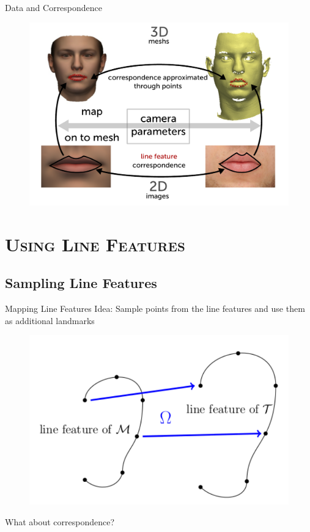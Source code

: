 \documentclass[xcolor=x11names,compress]{beamer}
\begin{document}
    \begin{frame}{Data and Correspondence}
        \begin{figure}
            \includegraphics[width=.9\textwidth]{../resources/figures/givendata3.pdf}
        \end{figure}
    \end{frame}

    \section{\scshape Using Line Features}
    \subsection{Sampling Line Features}
    \begin{frame}{Mapping Line Features}
        Idea: Sample points from the line features and use them as additional landmarks
        \begin{figure}
            \centering
            \includegraphics[width=.5\textwidth]{../resources/img/linefeaturemapping.pdf}
        \end{figure}
        What about correspondence?
    \end{frame}
\end{document}
